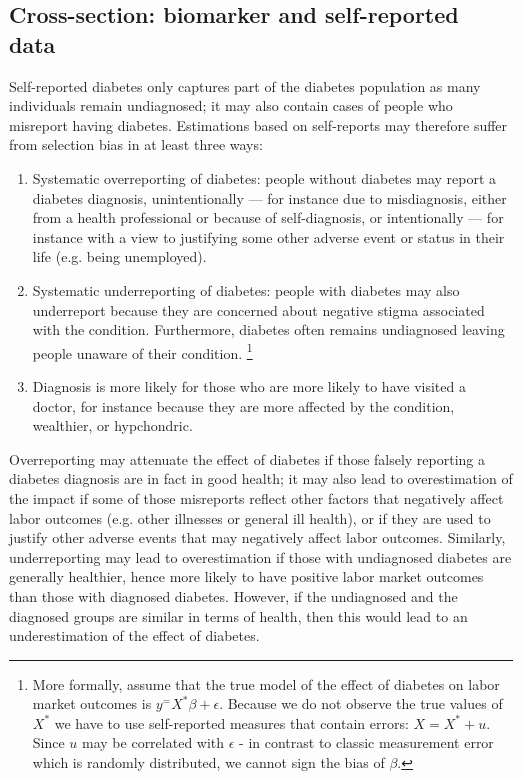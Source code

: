 \documentclass[12pt,english]{article}
\begin{document}
\subsection{\label{sec:Biomarker Strategy}Cross-section: biomarker and self-reported data}

Self-reported diabetes only captures part of the diabetes population as many individuals remain undiagnosed; it may also contain cases of people who misreport having diabetes.  Estimations based on self-reports may therefore suffer from selection bias in at least three ways:

\begin{enumerate}
\item Systematic overreporting of diabetes: people without diabetes
may report a diabetes diagnosis, unintentionally --- for instance due to misdiagnosis, either from a health professional or because of self-diagnosis, or intentionally --- for instance with a view to justifying some other adverse event or status in their life (e.g. being unemployed). 
\item Systematic underreporting of diabetes: people with diabetes may also underreport because they are concerned about negative stigma associated with the condition. Furthermore, diabetes often remains undiagnosed leaving people unaware of their condition.
\footnote{More formally, assume that the true model of the effect of diabetes on labor market outcomes is $y^=X^{*}\beta+\epsilon$. Because we do not observe the true values of  $X^{*}$  we have to use self-reported measures that contain errors: $X=X^{*} + u$. Since $u$ may be correlated with $\epsilon$ - in contrast to classic measurement error which is randomly distributed, we cannot sign the bias of  $\beta$.} 
\item Diagnosis is more likely for those who are more likely to have visited a doctor, for instance because they are more affected by the condition, wealthier, or hypchondric.   
\end{enumerate} 

Overreporting may attenuate the effect of diabetes if those falsely reporting a diabetes diagnosis are in fact in good health; it may also lead to overestimation of the impact if some of those misreports reflect other factors that negatively affect labor outcomes (e.g. other illnesses or general ill health), or if they are used to justify other adverse events that may negatively affect labor outcomes. Similarly, underreporting may lead to overestimation if those with undiagnosed diabetes are generally healthier, hence more likely to have positive labor market outcomes than those with diagnosed diabetes. However, if the undiagnosed and the diagnosed groups are similar in terms of health, then this would lead to an underestimation of the effect of diabetes. 
\end{document}
